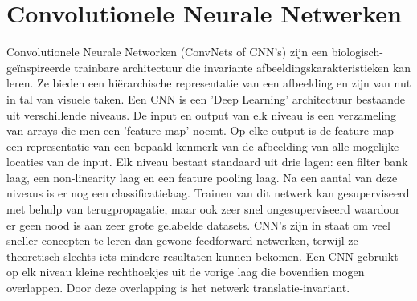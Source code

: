 \section{Convolutionele Neurale Netwerken}
Convolutionele Neurale Networken (ConvNets of CNN's) zijn een biologisch- ge\" inspireerde trainbare architectuur die invariante afbeeldingskarakteristieken kan leren. \cite{LeCun2010} Ze bieden een hi\"erarchische representatie van een afbeelding en zijn van nut in tal van visuele taken.\cite{Girshick2014}\cite{ciresan2012multi}\cite{lawrence1997face}
Een CNN is een 'Deep Learning' architectuur bestaande uit verschillende niveaus. De input en output van elk niveau is een verzameling van arrays die men een 'feature map' noemt. Op elke output is de feature map een representatie van een bepaald kenmerk van de afbeelding van alle mogelijke locaties van de input. Elk niveau bestaat standaard uit drie lagen: een filter bank laag, een non-linearity laag en een feature pooling laag. Na een aantal van deze niveaus is er nog een classificatielaag.
Trainen van dit netwerk kan gesuperviseerd met behulp van terugpropagatie, maar ook zeer snel ongesuperviseerd waardoor er geen nood is aan zeer grote gelabelde datasets. CNN's zijn in staat om veel sneller concepten te leren dan gewone feedforward netwerken, terwijl ze theoretisch slechts iets mindere resultaten kunnen bekomen. Een CNN gebruikt op elk niveau kleine rechthoekjes uit de vorige laag die bovendien mogen overlappen. Door deze overlapping is het netwerk translatie-invariant.


